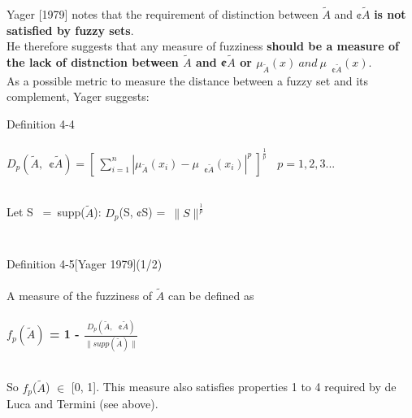 \documentclass{beamer}
\begin{document}
\begin{CJK*}{UTF8}{bsmi}
\begin{frame}
\frametitle{}
Yager [1979] notes that the requirement of distinction between $\tilde{A}$ and ¢$\tilde{A}$ \textbf{is not satisfied by fuzzy sets}.
\\
He therefore suggests that any measure of fuzziness \textbf{should be a measure of the lack of distnction between $\tilde{A}$ and ¢$\tilde{A}$ or $\mu_{\tilde{A}}(x)~ and~ \mu_{~~~¢\tilde{A}}(x)$}.\\
As a possible metric to measure the distance between a fuzzy set and its complement, Yager suggests:\\
\begin{block}{Definition 4-4}
~\\
~\\
\centering\textbf{\(D_{p}( \tilde{A},~~¢\tilde{A}) = [~ \sum_{i=1}^n   | \mu_{\tilde{A}}( x_{i}) - \mu_{~~~¢\tilde{A}}( x_{i} ) |^{p} ~]^ \frac{1}{p}  ~~~~p=1,2,3...\)}\\
~\\
\raggedright Let S ~=~supp($\tilde{A}$): $D_{p}$(S, ¢S) =~$\|S\|^\frac{1}{p}$\\
~\\
\end{block}

\end{frame}


\begin{frame}
\frametitle{}

\begin{block}{Definition 4-5[Yager 1979](1/2)}
~\\
~\\
A measure of the fuzziness of $\tilde{A}$ can be defined as\\
~\\
\centering\textbf{$f_{p}(\tilde{A})$ = 1 - $\frac{D_{p}(\tilde{A},~~~¢\tilde{A})}{\|supp(\tilde{A})\|}$}\\
~\\
\raggedright So $f_{p}$($\tilde{A}$) $\in$ [0, 1]. This measure also satisfies properties 1 to 4 required by de Luca and Termini (see above).\\
~\\
~\\
\end{block}

\end{frame}


\end{CJK*}
\end{document}
